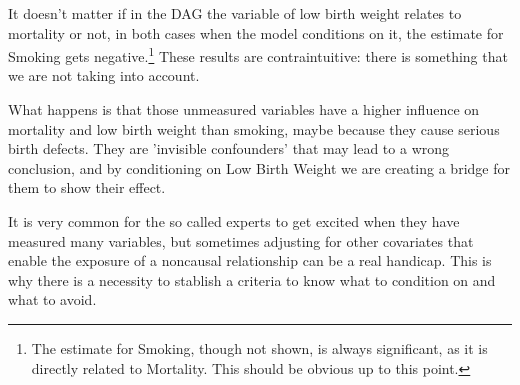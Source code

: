 \documentclass{article}
\begin{document}
It doesn't matter if in the DAG the variable of low birth weight relates to mortality or not, in both cases when the model conditions on it, the estimate for Smoking gets negative.\footnote{The estimate for Smoking, though not shown, is always significant, as it is directly related to Mortality. This should be obvious up to this point.} These results are contraintuitive: there is something that we are not taking into account.\par
What happens is that those unmeasured variables have a higher influence on mortality and low birth weight than smoking, maybe because they cause serious birth defects. They are 'invisible confounders' that may lead to a wrong conclusion, and by conditioning on Low Birth Weight we are creating a bridge for them to show their effect.\par
It is very common for the so called experts to get excited when they have measured many variables, but sometimes adjusting for other covariates that enable the exposure of a non\-causal relationship can be a real handicap. This is why there is a necessity to stablish a criteria to know what to condition on and what to avoid.\par
\end{document}
